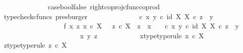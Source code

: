 \begin{isabellebody}
\ \ \ \ \ \ \ \ \ \ \ \ \isamarkupfalse%
\ case{\isacharunderscore}{\kern0pt}bool{\isacharunderscore}{\kern0pt}false\ right{\isacharunderscore}{\kern0pt}coproj{\isacharunderscore}{\kern0pt}cfunc{\isacharunderscore}{\kern0pt}coprod\ \isamarkupfalse%
\ {\isacharparenleft}{\kern0pt}typecheck{\isacharunderscore}{\kern0pt}cfuncs{\isacharcomma}{\kern0pt}\ presburger{\isacharparenright}{\kern0pt}\isanewline
\ \ \ \ \ \ \ \ \ \ \isamarkupfalse%
\ \isamarkupfalse%
\ {\isachardoublequoteopen}{\isacharparenleft}{\kern0pt}{\isasymTheta}\ {\isasymcirc}\isactrlsub c\ {\isasymlangle}x{\isacharcomma}{\kern0pt}\ y{\isasymrangle}{\isacharparenright}{\kern0pt}\isactrlsup {\isasymflat}\ {\isasymcirc}\isactrlsub c\ {\isasymlangle}id\ X{\isacharcomma}{\kern0pt}\ {\isasymbeta}\isactrlbsub X\isactrlesub {\isasymrangle}\ {\isasymcirc}\isactrlsub c\ z\ {\isacharequal}{\kern0pt}\ y{}{\isachardoublequoteclose}\isacommand{{\isachardot}{\kern0pt}}\isamarkupfalse%
\isanewline
\ \ \ \ \ \ \ \ \isamarkupfalse%
\isanewline
\ \ \ \ \ \ \ \ \isanewline
\ \ \ \ \ \ \ \ \isamarkupfalse%
\ f{}{\isacharcolon}{\kern0pt}\ {\isachardoublequoteopen}{\isasymAnd}x\ z{\isachardot}{\kern0pt}\ x\ {\isasymin}\isactrlsub c\ X\ {\isasymLongrightarrow}\ \ z\ {\isasymin}\isactrlsub c\ X\ {\isasymLongrightarrow}\ z\ {\isasymnoteq}\ x\ {\isasymLongrightarrow}\ \ {\isacharparenleft}{\kern0pt}{\isasymTheta}\ {\isasymcirc}\isactrlsub c\ {\isasymlangle}x{\isacharcomma}{\kern0pt}\ y{}{\isasymrangle}{\isacharparenright}{\kern0pt}\isactrlsup {\isasymflat}\ {\isasymcirc}\isactrlsub c\ {\isasymlangle}id\ X{\isacharcomma}{\kern0pt}\ {\isasymbeta}\isactrlbsub X\isactrlesub {\isasymrangle}\ {\isasymcirc}\isactrlsub c\ z\ {\isacharequal}{\kern0pt}\ y{}{\isachardoublequoteclose}\isanewline
\ \ \ \ \ \ \ \ \isamarkupfalse%
\ {\isacharminus}{\kern0pt}\ \isanewline
\ \ \ \ \ \ \ \ \ \ \isamarkupfalse%
\ x\ y\ z\isanewline
\ \ \ \ \ \ \ \ \ \ \isamarkupfalse%
\ x{\isacharunderscore}{\kern0pt}type{\isacharbrackleft}{\kern0pt}type{\isacharunderscore}{\kern0pt}rule{\isacharbrackright}{\kern0pt}{\isacharcolon}{\kern0pt}\ {\isachardoublequoteopen}x\ {\isasymin}\isactrlsub c\ X{\isachardoublequoteclose}\isanewline
\ \ \ \ \ \ \ \ \ \ \isamarkupfalse%
\ z{\isacharunderscore}{\kern0pt}type{\isacharbrackleft}{\kern0pt}type{\isacharunderscore}{\kern0pt}rule{\isacharbrackright}{\kern0pt}{\isacharcolon}{\kern0pt}\ {\isachardoublequoteopen}z\ {\isasymin}\isactrlsub c\ X{\isachardoublequoteclose}\isanewline

\end{isabellebody}
